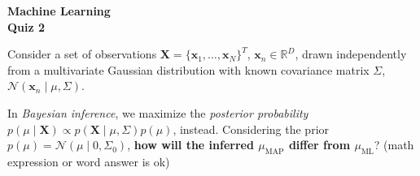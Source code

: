 \documentclass[11pt,noanswers,addpoints]{exam}
\DeclareMathOperator*{\argmax}{arg\,max}
\newcommand{\R}{\mathbb R}
\newcommand{\X}{\mathbf X}
\newcommand{\x}{\mathbf x}
\newcommand{\N}{\mathcal N}
\begin{document}
{\Large{\textbf{Machine Learning}}} \\[2mm]
\textbf{\Huge{Quiz 2}}

\hfill\hfill{}


\begin{questions}
\question Consider a set of observations $\X=\{\x_1,\ldots,\x_N\}^T$, $\x_n\in\R^D$, drawn independently from a multivariate Gaussian distribution with known covariance matrix $\Sigma$, $\N(\x_n\mid\mu,\Sigma)$.
\question[1] In \emph{Bayesian inference}, we maximize the \emph{posterior probability} $p(\mu\mid \X)\propto p(\X\mid\mu,\Sigma)p(\mu)$, instead. Considering the prior $p(\mu)=\N(\mu\mid 0, \Sigma_0)$, \textbf{how will the inferred $\mu_\text{MAP}$ differ from $\mu_\text{ML}$}? (math expression or word answer is ok)
\end{questions}
\end{document}
